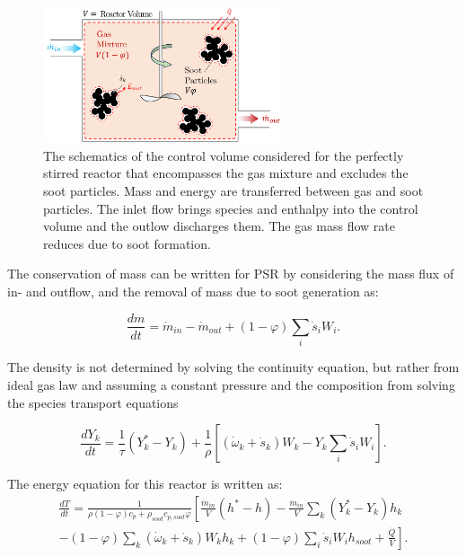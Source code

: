 \begin{figure}[!htbp]
	\centering
	\includegraphics[height=40mm, ]{Figures/Theory/PSR.pdf}
	\caption{The schematics of the control volume considered for the perfectly stirred reactor that encompasses the gas mixture and excludes the soot particles. Mass and energy are transferred between gas and soot particles. The inlet flow brings species and enthalpy into the control volume and the outlow discharges them. The gas mass flow rate reduces due to soot formation.}
	\label{fig:psrcv}
\end{figure}

The conservation of mass can be written for PSR by considering the mass flux of in- and outflow, and the removal of mass due to soot generation as:

\begin{equation}
	\frac{d m}{d t}
	=
	\dot{m}_{in} - \dot{m}_{out} 
	+ (1-\varphi) \sum_i \dot{s}_i W_i 
	\label{eqn:contpsr}.
\end{equation}

The density is not determined by solving the continuity equation, but rather from ideal gas law and assuming a constant pressure and the composition from solving the species transport equations

\begin{equation}
	\frac{d Y_k}{d t}
	=
	\frac{1}{\tau}
	\left( Y^*_k-Y_k \right)+
	\frac{1}{\rho}\left[\left(\dot{\omega}_k+\dot{s}_k\right) W_k-Y_k \sum_i \dot{s}_i W_i\right]
	\label{eqn:speciespsr}.
\end{equation}

The energy equation for this reactor is written as:
\begin{equation}
	\begin{split}
		\frac{dT}{dt}
		=
		\frac{1}
		{
			\rho\left(1-\varphi\right)c_p+\rho_{soot}c_{p,soot}\varphi
		}
		\left[
		\frac{{\dot{m}}_{in}}{V}
		\left(h^\ast-h\right)
		-
		\frac{{\dot{m}}_{in}}{V}\sum_{k}\left(Y_k^\ast-Y_k\right)h_k
		\right.\\
		\left.	
		-
		\left(1-\varphi\right)\sum_{k}{
			\left(
			{\dot{\omega}}_k
			+
			{\dot{s}}_k
			\right) W_k h_k}
		+\left(1-\varphi\right) \sum_{i}{{\dot{s}}_i W_i} h_{soot}+\frac{\dot{Q}}{V}
		\right].
	\end{split}
		\label{eqn:energypsr}
\end{equation}

